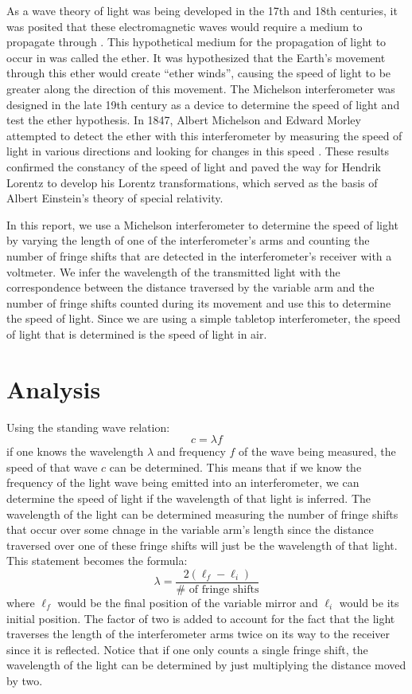 \documentclass[reprint,amsmath,amssymb,aps,prb,nofootinbib,floatfix]{revtex4-2}
\begin{document}
As a wave theory of light was being developed in the 17th and 18th centuries, it was posited that these electromagnetic waves would require a medium to propagate through \cite{boyle1772works}. This hypothetical medium for the propagation of light to occur in was called the ether. It was hypothesized that the Earth's movement through this ether would create ``ether winds'', causing the speed of light to be greater along the direction of this movement. The Michelson interferometer was designed in the late 19th century as a device to determine the speed of light and test the ether hypothesis. In 1847, Albert Michelson and Edward Morley attempted to detect the ether with this interferometer by measuring the speed of light in various directions and looking for changes in this speed \cite{Michelson1887On}. These results confirmed the constancy of the speed of light and paved the way for Hendrik Lorentz to develop his Lorentz transformations, which served as the basis of Albert Einstein's theory of special relativity. 

In this report, we use a Michelson interferometer to determine the speed of light by varying the length of one of the interferometer's arms and counting the number of fringe shifts that are detected in the interferometer's receiver with a voltmeter. We infer the wavelength of the transmitted light with the correspondence between the distance traversed by the variable arm and the number of fringe shifts counted during its movement and use this to determine the speed of light. Since we are using a simple tabletop interferometer, the speed of light that is determined is the speed of light in air. 

\section{Analysis}
Using the standing wave relation:
\begin{equation}\label{eq:light}
    c = \lambda f
\end{equation}
if one knows the wavelength $\lambda$ and frequency $f$ of the wave being measured, the speed of that wave $c$ can be determined. This means that if we know the frequency of the light wave being emitted into an interferometer, we can determine the speed of light if the wavelength of that light is inferred. The wavelength of the light can be determined measuring the number of fringe shifts that occur over some chnage in the variable arm's length since the distance traversed over one of these fringe shifts will just be the wavelength of that light. This statement becomes the formula:
\begin{equation}\label{eq:lambda}
    \lambda = \frac{2\left( \ell_f - \ell_i\right)}{\# \text{ of fringe shifts}}
\end{equation}
where $\ell_f$ would be the final position of the variable mirror and $\ell_i$ would be its initial position. The factor of two is added to account for the fact that the light traverses the length of the interferometer arms twice on its way to the receiver since it is reflected. Notice that if one only counts a single fringe shift, the wavelength of the light can be determined by just multiplying the distance moved by two.
\end{document}
